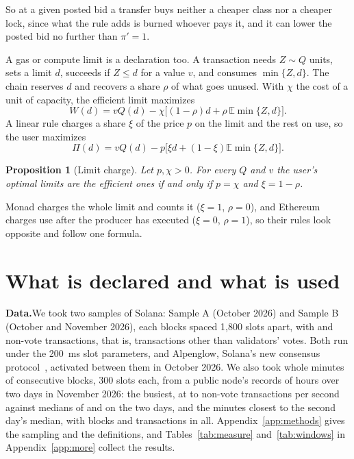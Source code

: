 \documentclass[conference,compsoc]{IEEEtran}
\numberwithin{equation}{section}
\theoremstyle{plain}
\newtheorem{proposition}[theorem]{Proposition}
\theoremstyle{definition}
\theoremstyle{remark}
\newcommand{\runin}[1]{\par\smallskip\noindent\textbf{#1.}\enspace}
\begin{document}
So at a given posted bid a transfer buys neither a cheaper class nor a cheaper lock, since what the rule adds is burned whoever pays it, and it can lower the posted bid no further than $\pi' = 1$.

A gas or compute limit is a declaration too. A transaction needs $Z \sim Q$ units, sets a limit $d$, succeeds if $Z \le d$ for a value $v$, and consumes $\min\{Z, d\}$. The chain reserves $d$ and recovers a share $\rho$ of what goes unused. With $\chi$ the cost of a unit of capacity, the efficient limit maximizes
\begin{equation}\label{eq:capS}
W(d) = v Q(d) - \chi\bigl[(1-\rho) d + \rho\,\mathbb{E}\min\{Z,d\}\bigr].
\end{equation}
A linear rule charges a share $\xi$ of the price $p$ on the limit and the rest on use, so the user maximizes
\begin{equation}\label{eq:capU}
\Pi(d) = v Q(d) - p\bigl[\xi d + (1-\xi)\mathbb{E}\min\{Z,d\}\bigr].
\end{equation}

\begin{proposition}[Limit charge]\label{prop:caps}
Let $p, \chi > 0$. For every $Q$ and $v$ the user's optimal limits are the efficient ones if and only if $p = \chi$ and $\xi = 1 - \rho$.
\end{proposition}

Monad charges the whole limit and counts it ($\xi = 1$, $\rho = 0$), and Ethereum charges use after the producer has executed ($\xi = 0$, $\rho = 1$), so their rules look opposite and follow one formula.

\section{What is declared and what is used}\label{sec:measure}

\runin{Data}We took two samples of Solana: Sample A (October 2026) and Sample B (October and November 2026), each \nBlocksA{} blocks spaced 1,800 slots apart, with \nTxA{} and \nTxB{} non-vote transactions, that is, transactions other than validators' votes. Both run under the 200~ms slot parameters, and Alpenglow, Solana's new consensus protocol~\cite{simd0326}, activated between them in October 2026. We also took whole minutes of consecutive blocks, 300 slots each, from a public node's records of \winRecordHours{} hours over two days in November 2026: the \nPeak{} busiest, at \winTpsLo{} to \winTpsHi{} non-vote transactions per second against medians of \winTpsMedianOne{} and \winTpsMedianTwo{} on the two days, and the \nMedian{} minutes closest to the second day's median, with \nMinuteBlocks{} blocks and \nMinuteTx{} transactions in all. Appendix~\ref{app:methods} gives the sampling and the definitions, and Tables~\ref{tab:measure} and~\ref{tab:windows} in Appendix~\ref{app:more} collect the results.
\end{document}
